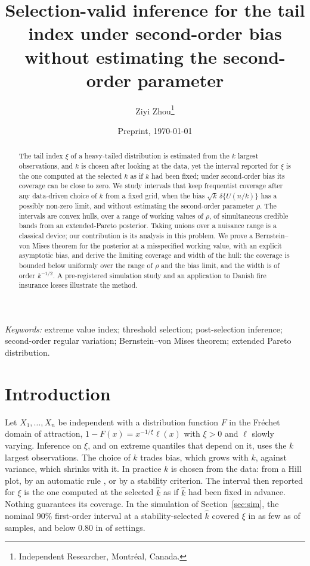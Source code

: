 \documentclass[11pt]{article}
\title{Selection-valid inference for the tail index under second-order bias\\ without estimating the second-order parameter}
\author{Ziyi Zhou\thanks{Independent Researcher, Montr\'eal, Canada.}}
\date{Preprint, \today}
\theoremstyle{definition}
\theoremstyle{remark}
\numberwithin{equation}{section}
\begin{document}
\maketitle

\begin{abstract}
The tail index $\xi$ of a heavy-tailed distribution is estimated from the $k$ largest observations, and $k$ is chosen after looking at the data, yet the interval reported for $\xi$ is the one computed at the selected $k$ as if $k$ had been fixed; under second-order bias its coverage can be close to zero. We study intervals that keep frequentist coverage after any data-driven choice of $k$ from a fixed grid, when the bias $\sqrt{k}\,\delta\{U(n/k)\}$ has a possibly non-zero limit, and without estimating the second-order parameter $\rho$. The intervals are convex hulls, over a range of working values of $\rho$, of simultaneous credible bands from an extended-Pareto posterior. Taking unions over a nuisance range is a classical device; our contribution is its analysis in this problem. We prove a Bernstein--von Mises theorem for the posterior at a misspecified working value, with an explicit asymptotic bias, and derive the limiting coverage and width of the hull: the coverage is bounded below uniformly over the range of $\rho$ and the bias limit, and the width is of order $k^{-1/2}$. A pre-registered simulation study and an application to Danish fire insurance losses illustrate the method.
\end{abstract}

\noindent\textit{Keywords:} extreme value index; threshold selection; post-selection inference; second-order regular variation; Bernstein--von Mises theorem; extended Pareto distribution.

\section{Introduction}\label{sec:intro}

Let $X_1,\dots,X_n$ be independent with a distribution function $F$ in the Fr\'echet domain of attraction, $1-F(x)=x^{-1/\xi}\ell(x)$ with $\xi>0$ and $\ell$ slowly varying. Inference on $\xi$, and on extreme quantiles that depend on it, uses the $k$ largest observations. The choice of $k$ trades bias, which grows with $k$, against variance, which shrinks with it. In practice $k$ is chosen from the data: from a Hill plot, by an automatic rule \citep{dreeskaufmann1998,guillouhall2001,schneider2021}, or by a stability criterion. The interval then reported for $\xi$ is the one computed at the selected $\hat k$ as if $\hat k$ had been fixed in advance. Nothing guarantees its coverage. In the simulation of Section~\ref{sec:sim}, the nominal 90\% first-order interval at a stability-selected $\hat k$ covered $\xi$ in as few as \foLepskiMin{} of samples, and below $0.80$ in \foLepskiN{} of \nCellsIn{} settings.
\end{document}

